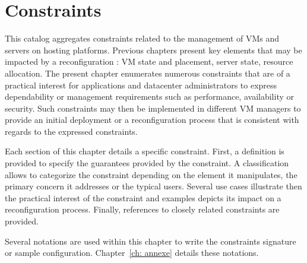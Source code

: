 \chapter{Constraints}
\label{ch: constraints}


This catalog aggregates constraints related to the management of VMs and
servers on hosting platforms. 
%
Previous chapters present key elements that may be impacted by a reconfiguration :
VM state and placement, server state, resource allocation.
%
The present chapter enumerates numerous constraints that are of a practical interest
for applications and datacenter administrators to express dependability or management
requirements such as performance, availability or security.
%
Such constraints may then be implemented in different VM managers to provide an initial
deployment or a reconfiguration process that is consistent with regards to the expressed
constraints.
 
 
Each section of this chapter details a specific constraint.
First, a definition is provided to specify the guarantees provided by the constraint.
%
A classification allows to categorize the constraint depending on the element it manipulates,
the primary concern it addresses or the typical users.
%
Several use cases illustrate then the practical interest of the constraint and examples depicts its 
impact on a reconfiguration process.
%
Finally, references to closely related constraints are provided.

Several notations are used within this chapter to write the constraints signature or sample configuration.
Chapter~\ref{ch: annexe} details these notations.


